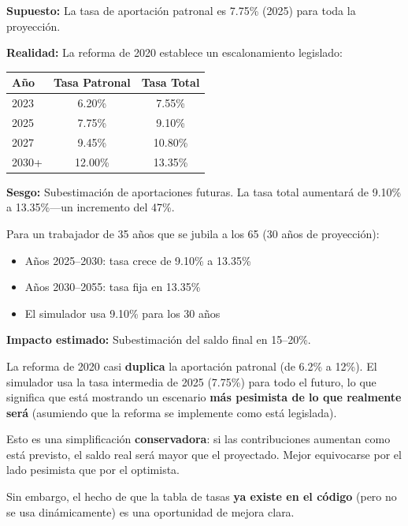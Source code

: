 \documentclass[11pt,a4paper]{report}
\begin{document}
\begin{tcolorbox}[colback=blue!5!white, colframe=blue!75!black, title=\textbf{Definici\'on Formal}]
\textbf{Supuesto:} La tasa de aportaci\'on patronal es 7.75\% (2025) para toda la proyecci\'on.

\textbf{Realidad:} La reforma de 2020 establece un escalonamiento legislado:

\begin{center}
\begin{tabular}{lcc}
\toprule
\textbf{A\~no} & \textbf{Tasa Patronal} & \textbf{Tasa Total} \\
\midrule
2023 & 6.20\% & 7.55\% \\
2025 & 7.75\% & 9.10\% \\
2027 & 9.45\% & 10.80\% \\
2030+ & 12.00\% & 13.35\% \\
\bottomrule
\end{tabular}
\end{center}

\textbf{Sesgo:} Subestimaci\'on de aportaciones futuras. La tasa total aumentar\'a de 9.10\% a 13.35\%---un incremento del 47\%.

Para un trabajador de 35 a\~nos que se jubila a los 65 (30 a\~nos de proyecci\'on):
\begin{itemize}
  \item A\~nos 2025--2030: tasa crece de 9.10\% a 13.35\%
  \item A\~nos 2030--2055: tasa fija en 13.35\%
  \item El simulador usa 9.10\% para los 30 a\~nos
\end{itemize}

\textbf{Impacto estimado:} Subestimaci\'on del saldo final en 15--20\%.
\end{tcolorbox}

\begin{tcolorbox}[colback=green!5!white, colframe=green!50!black, title=\textbf{Intuici\'on}]
La reforma de 2020 casi \textbf{duplica} la aportaci\'on patronal (de 6.2\% a 12\%). El simulador usa la tasa intermedia de 2025 (7.75\%) para todo el futuro, lo que significa que est\'a mostrando un escenario \textbf{m\'as pesimista de lo que realmente ser\'a} (asumiendo que la reforma se implemente como est\'a legislada).

Esto es una simplificaci\'on \textbf{conservadora}: si las contribuciones aumentan como est\'a previsto, el saldo real ser\'a mayor que el proyectado. Mejor equivocarse por el lado pesimista que por el optimista.

Sin embargo, el hecho de que la tabla de tasas \textbf{ya existe en el c\'odigo} (pero no se usa din\'amicamente) es una oportunidad de mejora clara.
\end{tcolorbox}
\end{document}
